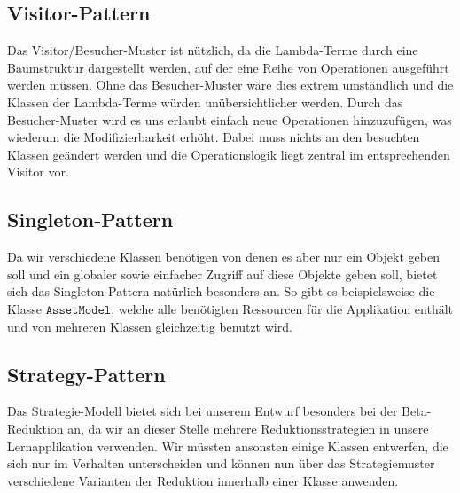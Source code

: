 \subsection{Visitor-Pattern}
Das Visitor/Besucher-Muster ist nützlich, da die Lambda-Terme durch eine Baumstruktur dargestellt werden, auf der eine Reihe von Operationen
ausgeführt werden müssen. Ohne das Besucher-Muster wäre dies extrem umständlich und die Klassen der Lambda-Terme würden unübersichtlicher
werden. Durch das Besucher-Muster wird es uns erlaubt einfach neue Operationen hinzuzufügen, was wiederum die Modifizierbarkeit erhöht.
Dabei muss nichts an den besuchten Klassen geändert werden und die Operationslogik liegt zentral im entsprechenden Visitor vor.

\subsection{Singleton-Pattern}
Da wir verschiedene Klassen benötigen von denen es aber nur ein Objekt geben soll und ein globaler sowie einfacher Zugriff auf diese Objekte geben soll, bietet sich das Singleton-Pattern natürlich besonders an. So gibt es beispielsweise die Klasse $\texttt{AssetModel}$, welche alle benötigten Ressourcen für die Applikation enthält und von mehreren Klassen gleichzeitig benutzt wird.

\subsection{Strategy-Pattern}
Das Strategie-Modell bietet sich bei unserem Entwurf besonders bei der Beta-Reduktion an, da wir an dieser Stelle mehrere Reduktionsstrategien in unsere Lernapplikation verwenden. Wir müssten ansonsten einige Klassen entwerfen, die sich nur im Verhalten unterscheiden und können nun über das Strategiemuster verschiedene Varianten der Reduktion innerhalb einer Klasse anwenden.

